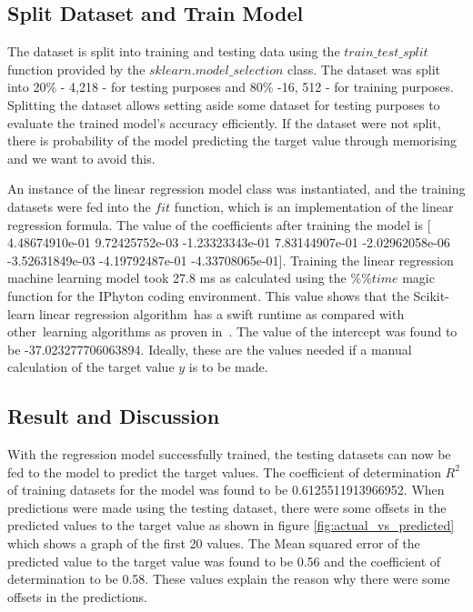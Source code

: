 \documentclass[conference]{IEEEtran}
\begin{document}
\subsection{Split Dataset and Train Model}
The dataset is split into training and testing data using the $train\_test\_split$ function provided by the $sklearn.model\_selection$ class. The dataset was split into 20\% - 4,218 - for testing purposes and 80\% -16, 512 - for training purposes. Splitting the dataset allows setting aside some dataset for testing purposes to evaluate the trained model's accuracy efficiently. If the dataset were not split, there is probability of the model predicting the target value through memorising and we want to avoid this. 

An instance of the linear regression model class was instantiated, and the training datasets were fed into the $fit$ function, which is an implementation of the linear regression formula. The value of the coefficients after training the model is [ 4.48674910e-01 9.72425752e-03 -1.23323343e-01 7.83144907e-01
 -2.02962058e-06 -3.52631849e-03 -4.19792487e-01 -4.33708065e-01]. Training the linear regression machine learning model took 27.8 ms as calculated using the $\%\%time$ magic function for the IPhyton coding environment. This value shows that the Scikit-learn linear regression algorithm has a swift runtime as compared with other learning algorithms as proven in \cite{massaron2016regression}. The value of the intercept was found to be -37.023277706063894. Ideally, these are the values needed if a manual calculation of the target value $y$ is to be made. 

\subsection{Result and Discussion}
With the regression model successfully trained, the testing datasets can now be fed to the model to predict the target values. The coefficient of determination $R^2$ of training datasets for the model was found to be 0.6125511913966952.
When predictions were made using the testing dataset, there were some offsets in the predicted values to the target value as shown in figure \ref{fig:actual_vs_predicted} which shows a graph of the first 20 values. The Mean squared error of the predicted value to the target value was found to be 0.56 and the coefficient of determination to be 0.58. These values explain the reason why there were some offsets in the predictions.
\end{document}
